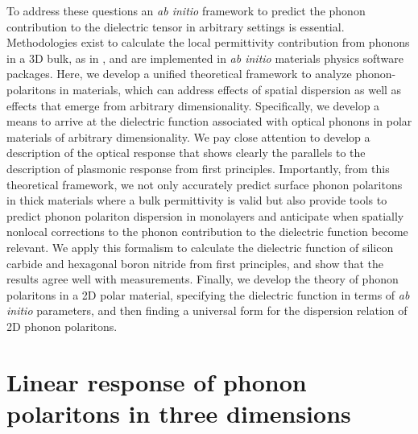 \documentclass[aps,prb,twocolumn,
	groupedaddress,superscriptaddress,
	amsfonts,amssymb,amsmath,floatfix,
	citeautoscript]{revtex4-1}
\begin{document}
To address these questions an \emph{ab initio} framework to predict the phonon contribution to the dielectric tensor in arbitrary settings is essential. Methodologies exist to calculate the local permittivity contribution from phonons in a 3D bulk, as in \cite{Gonze1997dynamical}, and are implemented in \emph{ab initio} materials physics software packages\cite{abinit1,abinit2,abinit3}. Here, we develop a unified 
theoretical framework to analyze phonon-polaritons in materials, which can address effects of spatial dispersion as well as effects that emerge from arbitrary dimensionality. Specifically, we develop a means to arrive at the dielectric function associated with optical phonons in polar materials of arbitrary dimensionality. We pay close attention to develop a description of the optical response that shows clearly the parallels to the description of plasmonic response from first principles. Importantly, from this theoretical framework, we not only accurately predict surface phonon polaritons in thick materials where a bulk permittivity is valid but also provide tools to predict phonon polariton dispersion in monolayers and anticipate when spatially nonlocal corrections to the phonon contribution to the dielectric function become relevant. We apply this formalism to calculate the dielectric function of silicon carbide and hexagonal boron nitride from first principles, and show that the results agree well with measurements. Finally, we develop the theory of phonon polaritons in a 2D polar material, specifying the dielectric function in terms of \emph{ab initio} parameters, and then finding a universal form for the dispersion relation of 2D phonon polaritons.

\section{Linear response of phonon polaritons in three dimensions}
\end{document}
